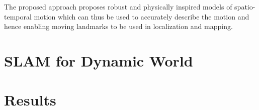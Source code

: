 \documentclass[10pt,twocolumn,letterpaper]{article}
\begin{document}
The proposed approach proposes robust and physically inspired models of spatio-temporal motion which can thus be used to accurately describe the motion and hence enabling moving landmarks to be used in localization and mapping.

\section{SLAM for Dynamic World}

\section{Results}

{\small


}
\end{document}
